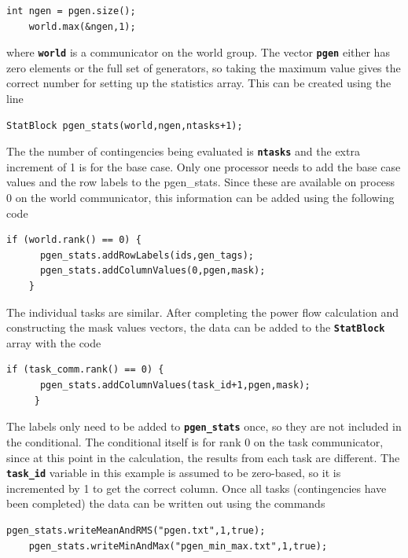 \documentclass[12pt]{report} %
\begin{document}
{
\color{red}
\begin{Verbatim}[fontseries=b]
    int ngen = pgen.size();
    world.max(&ngen,1);
\end{Verbatim}
}

where \texttt{\textbf{world}} is a communicator on the world group. The vector \texttt{\textbf{pgen}} either has zero elements or the full set of generators, so taking the maximum value gives the correct number for setting up the statistics array. This can be created using the line

{
\color{red}
\begin{Verbatim}[fontseries=b]
    StatBlock pgen_stats(world,ngen,ntasks+1);
\end{Verbatim}
}

The the number of contingencies being evaluated is \texttt{\textbf{ntasks}} and the extra increment of 1 is for the base case. Only one processor needs to add the base case values and the row labels to the pgen\_stats. Since these are available on process 0 on the world communicator, this information can be added using the following code

{
\color{red}
\begin{Verbatim}[fontseries=b]
    if (world.rank() == 0) {
      pgen_stats.addRowLabels(ids,gen_tags);
      pgen_stats.addColumnValues(0,pgen,mask);
    }
\end{Verbatim}
}

The individual tasks are similar. After completing the power flow calculation and constructing the mask values vectors, the data can be added to the \texttt{\textbf{StatBlock}} array with the code

{
\color{red}
\begin{Verbatim}[fontseries=b]
     if (task_comm.rank() == 0) {
      pgen_stats.addColumnValues(task_id+1,pgen,mask);
     }
\end{Verbatim}
}

The labels only need to be added to \texttt{\textbf{pgen\_stats}} once, so they are not included in the conditional. The conditional itself is for rank 0 on the task communicator, since at this point in the calculation, the results from each task are different. The \texttt{\textbf{task\_id}} variable in this example is assumed to be zero-based, so it is incremented by 1 to get the correct column.
Once all tasks (contingencies have been completed) the data can be written out using the commands

{
\color{red}
\begin{Verbatim}[fontseries=b]
    pgen_stats.writeMeanAndRMS("pgen.txt",1,true);
    pgen_stats.writeMinAndMax("pgen_min_max.txt",1,true);
\end{Verbatim}
}
\end{document}
